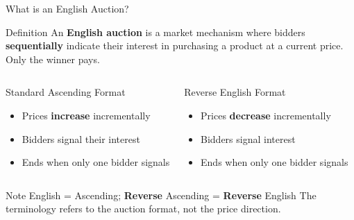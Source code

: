\documentclass[xcolor={x11names}]{beamer}
\begin{document}
\begin{frame}{What is an English Auction?}

\begin{block}{Definition}
An \textbf{English auction} is a market mechanism where bidders \textbf{sequentially} indicate their interest in purchasing a product at a current price. Only the winner pays.
\end{block}

\begin{columns}[T]
\begin{exampleblock}{Standard Ascending Format}
\begin{itemize}
\item Prices \textbf{increase} incrementally
\item Bidders signal their interest
\item Ends when only one bidder signals
\end{itemize}
\end{exampleblock}

\begin{exampleblock}{Reverse English Format}
\begin{itemize}
\item Prices \textbf{decrease} incrementally
\item Bidders signal interest
\item Ends when only one bidder signals
\end{itemize}
\end{exampleblock}
\end{columns}

\begin{alertblock}{Note}
English = Ascending; \textbf{Reverse} Ascending = \textbf{Reverse} English
The terminology refers to the auction format, not the price direction.
\end{alertblock}

\end{frame}
\end{document}
